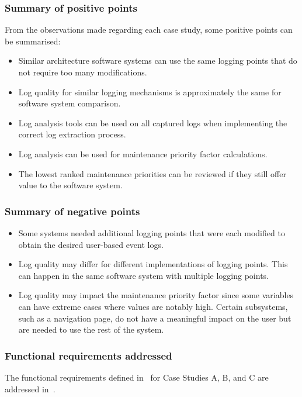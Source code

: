 \clearpage

\subsubsection{Summary of positive points}
From the observations made regarding each case study, some positive points can be summarised:

\begin{itemize}
	\item Similar architecture software systems can use the same logging points that do not require too many modifications.
	\item Log quality for similar logging mechanisms is approximately the same for software system comparison.
	\item Log analysis tools can be used on all captured logs when implementing the correct log extraction process.
	\item Log analysis can be used for maintenance priority factor calculations.
	\item The lowest ranked maintenance priorities can be reviewed if they still offer value to the software system.
\end{itemize}

\subsubsection{Summary of negative points}

\begin{itemize}
	\item Some systems needed additional logging points that were each modified to obtain the desired user-based event logs.
	\item Log quality may differ for different implementations of logging points. This can happen in the same software system with multiple logging points.
	\item Log quality may impact the maintenance priority factor since some variables can have extreme cases where values are notably high. Certain subsystems, such as a navigation page, do not have a meaningful impact on the user but are needed to use the rest of the system.
\end{itemize}

\clearpage

\subsubsection{Functional requirements addressed}
The functional requirements defined in~ for Case Studies A, B, and C are addressed in~.

